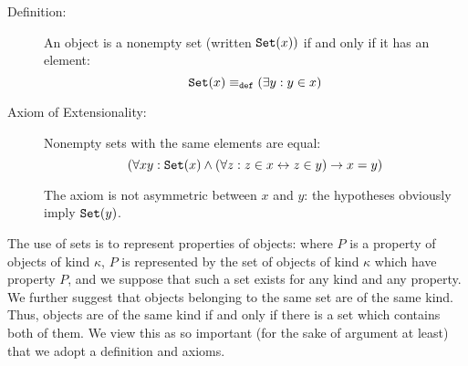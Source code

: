 \documentclass[12pt]{article}
\begin{document}
\begin{description}

\item[Definition:]  An object is a nonempty set (written ${\tt Set}(x))$ if and only if it has an element:  $${\tt Set}(x) \equiv_{\tt def} (\exists y:y \in x)$$

\item[Axiom of Extensionality:]  Nonempty sets with the same elements are equal:  $$(\forall xy:{\tt Set}(x) \wedge(\forall z:z \in x \leftrightarrow z \in y) \rightarrow x=y)$$

The axiom is not asymmetric between $x$ and $y$:  the hypotheses obviously imply ${\tt Set}(y)$.

\end{description}

The use of sets is to represent properties of objects:  where $P$ is a property of objects of kind $\kappa$, $P$ is represented by the set of objects of kind $\kappa$
which have property $P$, and we suppose that such a set exists for any kind and any property.  We further suggest that objects belonging to the same set are of the same kind.  Thus, objects are of the same kind if and only if there is a set which contains both of them.  We view this as so important (for the sake of argument 
at least) that we adopt a definition and axioms.
\end{document}

